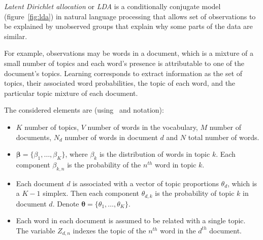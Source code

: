 
\emph{Latent Dirichlet allocation} or \emph{LDA} is a conditionally conjugate model (figure~\ref{fig:lda}) in natural language processing that allows set of observations to be explained by unobserved groups that explain why some parts of the data are similar.

For example, observations may be words in a document, which is a mixture of a small number of topics and each word's presence is attributable to one of the document's topics. Learning corresponds to extract information as the set of topics, their associated word probabilities, the topic of each word, and the particular topic mixture of each document.

The considered elements are (using~\cite{hoffman2013stochastic} and \cite{blei2003latent} notation):
\begin{itemize}\setlength\itemsep{1em}
  \item \(K\) number of topics, \(V\) number of words in the vocabulary, \(M\) number of documents, \(N_{d}\) number of words in document \(d\) and \(N\) total number of words.
  \item \(\bm{\beta} = \{\beta_{1}, \dots, \beta_{K}\}\), where \(\beta_{k}\) is the distribution of words in topic \(k\). Each component \(\beta_{k,n}\) is the probability of the \(n^{th}\) word in topic \(k\).

  \item Each document \(d\) is associated with a vector of topic proportions \(\theta_{d}\), which is a \(K-1\) simplex. Then each component \(\theta_{d,k}\) is the probability of topic \(k\) in document \(d\). Denote \(\bm{\theta} = \{\theta_{1},\dots,\theta_{K}\}\).
  \item Each word in each document is assumed to be related with a single topic. The variable \(Z_{d,n}\) indexes the topic of the \(n^{th}\) word in the \(d^{th}\) document.
\end{itemize}

